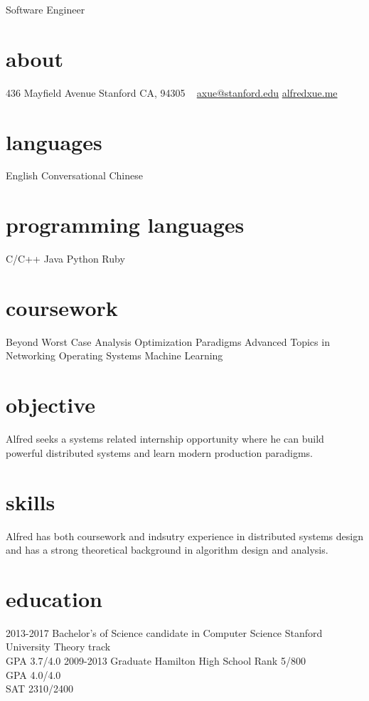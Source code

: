 \documentclass[]{friggeri-cv}
\begin{document}
       {Software Engineer}


\begin{aside}
  \section{about}
    436 Mayfield Avenue
    Stanford CA, 94305
    ~
    \href{mailto:axue@stanford.edu}{axue@stanford.edu}
    \href{http://alfredxue.me}{alfredxue.me}
  \section{languages}
    English
    Conversational Chinese
  \section{programming languages}
    C/C++
    Java
    Python
    Ruby
  \section{coursework}
    Beyond Worst Case Analysis
    Optimization Paradigms
    Advanced Topics in Networking
    Operating Systems
    Machine Learning
\end{aside}

\section{objective}

Alfred seeks a systems related internship opportunity where he can build powerful distributed systems and learn modern production paradigms.  

\section{skills}

Alfred has both coursework and indsutry experience in distributed systems design and has a strong theoretical background in algorithm design and analysis.

\section{education}
\begin{entrylist}
  \entry
    {2013-2017}
    {Bachelor's of Science {\normalfont candidate in Computer Science}}
    {Stanford University}
    {Theory track \\
     GPA 3.7/4.0}
  \entry
    {2009-2013}
    {Graduate}
    {Hamilton High School}
    {Rank 5/800 \\ 
    GPA 4.0/4.0 \\
    SAT 2310/2400}
\end{entrylist}
\end{document}
